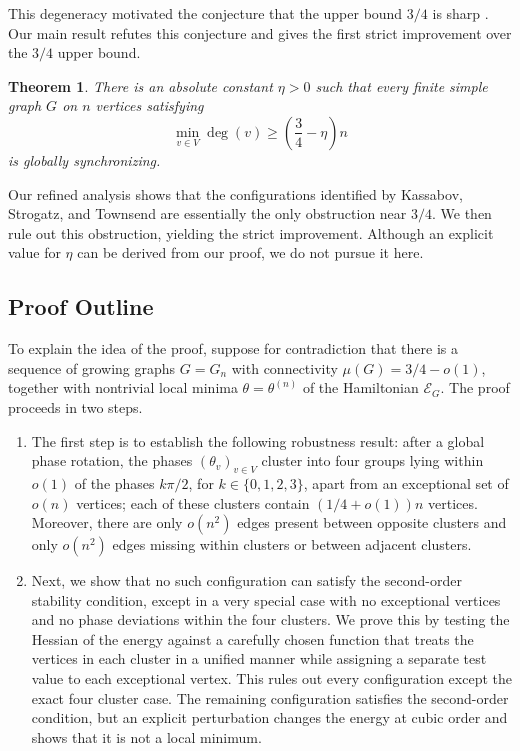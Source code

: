 \documentclass[reqno,11pt]{amsart}
\newtheorem{theorem}{Theorem}
\theoremstyle{definition}
\newcommand{\paren}[1]{\left(#1\right)}
\begin{document}
This degeneracy motivated the conjecture that the upper bound \(3/4\) is sharp \cite[Conjecture~5]{randomstrasse-25}. Our main result refutes this conjecture and gives the first strict improvement over the $3/4$ upper bound.  

\begin{theorem}\label{thm:main}
There is an absolute constant \(\eta>0\) such that every finite simple graph \(G\) on \(n\) vertices satisfying
\[
    \min_{v \in V} \deg(v)\ge\paren{\frac34-\eta}n
\]
is globally synchronizing.
\end{theorem}

Our refined analysis shows that the configurations identified by Kassabov, Strogatz, and Townsend are essentially the only obstruction near \(3/4\). We then rule out this obstruction, yielding the strict improvement. Although an explicit value for  $\eta$ can be derived from our proof, we do not pursue it here.


\subsection{Proof Outline}

To explain the idea of the proof, suppose for contradiction that there is a sequence of growing graphs $G= G_n$ with connectivity $\mu(G)=3/4-o(1)$, together with nontrivial local minima $\theta = \theta^{(n)}$ of the Hamiltonian $\mathcal E_{G}$. The proof proceeds in two steps.

\begin{enumerate}
    \item The first step is to establish the following robustness result: after a global phase rotation, the phases $(\theta_v)_{v \in V}$ cluster into four groups lying within $o(1)$ of the phases $k\pi/2$, for $k\in\{0,1,2,3\}$, apart from an exceptional set of  $o(n)$ vertices; each of these clusters contain $(1/4+o(1))n$ vertices. Moreover, there are only $o(n^2)$ edges present between opposite clusters and only $o(n^2)$ edges missing within clusters or between adjacent clusters. 

    \item Next, we show that no such configuration can satisfy the
    second-order stability condition, except in a very special case with
    no exceptional vertices and no phase deviations within the four clusters. We prove this by testing the Hessian of the energy against a carefully chosen function that treats the vertices in each cluster in a unified manner while assigning a separate test value to each  exceptional vertex. This rules out every configuration except the exact four cluster case. The remaining configuration satisfies the  second-order condition, but an explicit perturbation changes the energy at cubic order and shows that it is not a local minimum.
\end{enumerate}
\end{document}
